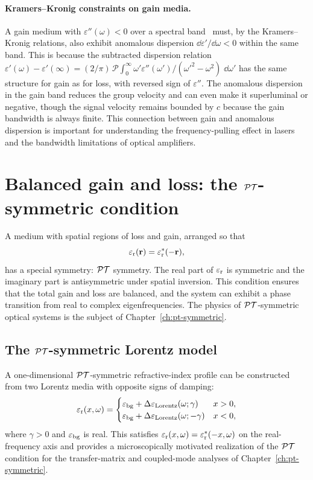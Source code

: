 \paragraph{Kramers--Kronig constraints on gain media.}
A gain medium with $\varepsilon''(\omega) < 0$ over a spectral band~\cite{rter2010observation,feng2012experimental}
must, by the Kramers--Kronig relations, also exhibit anomalous
dispersion $\dd\varepsilon'/\dd\omega < 0$ within the same band. This
is because the subtracted dispersion relation
$\varepsilon'(\omega) - \varepsilon'(\infty) =
(2/\pi)\,\mathcal{P}\!\int_0^\infty
\omega'\varepsilon''(\omega')/(\omega'^2-\omega^2)\;\dd\omega'$
has the same structure for gain as for loss, with reversed sign of
$\varepsilon''$. The anomalous dispersion in the gain band reduces the
group velocity and can even make it superluminal or negative, though the
signal velocity remains bounded by $c$ because the gain bandwidth is
always finite. This connection between gain and anomalous dispersion is
important for understanding the frequency-pulling effect in lasers and
the bandwidth limitations of optical amplifiers.


\section{Balanced gain and loss: the $\mathcal{PT}$-symmetric condition}
\label{sec:pt-preview}

A medium with spatial regions of loss and gain, arranged so that
\begin{equation}
 \varepsilon_{\mathrm{r}}(\mathbf{r}) = \varepsilon_{\mathrm{r}}^*(-\mathbf{r}),
 \label{eq:pt-condition-preview}
\end{equation}
has a special symmetry: $\mathcal{PT}$ symmetry. The real part of $\varepsilon_{\mathrm{r}}$ is
symmetric and the imaginary part is antisymmetric under spatial inversion.
This condition ensures that the total gain and loss are balanced, and the
system can exhibit a phase transition from real to complex eigenfrequencies.
The physics of $\mathcal{PT}$-symmetric optical systems is the subject of
Chapter~\ref{ch:pt-symmetric}.

\subsection{The $\mathcal{PT}$-symmetric Lorentz model}
\label{ssec:pt-lorentz}

A one-dimensional $\mathcal{PT}$-symmetric refractive-index profile can be
constructed from two Lorentz media with opposite signs of damping:
\begin{equation}
 \varepsilon_{\mathrm{r}}(x,\omega) = \begin{cases}
 \varepsilon_{\mathrm{bg}} + \Delta\varepsilon_{\mathrm{Lorentz}}(\omega;\gamma) & x > 0,\\
 \varepsilon_{\mathrm{bg}} + \Delta\varepsilon_{\mathrm{Lorentz}}(\omega;-\gamma) & x < 0,
 \end{cases}
 \label{eq:pt-lorentz-profile}
\end{equation}
where $\gamma > 0$ and $\varepsilon_{\mathrm{bg}}$ is real. This satisfies
$\varepsilon_{\mathrm{r}}(x,\omega)=\varepsilon_{\mathrm{r}}^*(-x,\omega)$ on the real-frequency axis and provides a
microscopically motivated realization of the $\mathcal{PT}$ condition for the
transfer-matrix and coupled-mode analyses of
Chapter~\ref{ch:pt-symmetric}.


